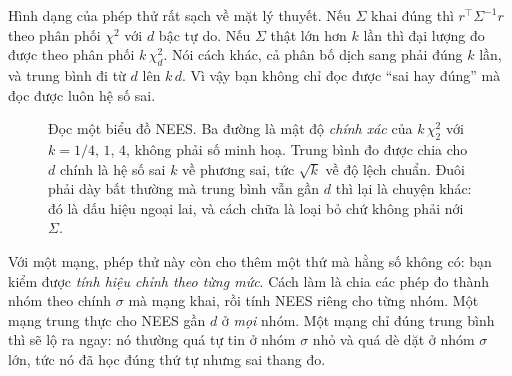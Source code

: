 \documentclass[../../deep_learning.tex]{subfiles}
\begin{document}
Hình dạng của phép thử rất sạch về mặt lý thuyết. Nếu \(\Sigma\) khai đúng thì \(r^{\top}\Sigma^{-1}r\) theo phân phối \(\chi^2\) với \(d\) bậc tự do. Nếu \(\Sigma\) thật lớn hơn \(k\) lần thì đại lượng đo được theo phân phối \(k\,\chi^2_d\). Nói cách khác, cả phân bố dịch sang phải đúng \(k\) lần, và trung bình đi từ \(d\) lên \(k\,d\). Vì vậy bạn không chỉ đọc được ``sai hay đúng'' mà đọc được luôn hệ số sai.

\begin{figure}[H]\centering
{}
\caption{Đọc một biểu đồ NEES. Ba đường là mật độ \emph{chính xác} của \(k\,\chi^2_2\) với \(k = 1/4,\,1,\,4\), không phải số minh hoạ. Trung bình đo được chia cho \(d\) chính là hệ số sai \(k\) về phương sai, tức \(\sqrt{k}\) về độ lệch chuẩn. Đuôi phải dày bất thường mà trung bình vẫn gần \(d\) thì lại là chuyện khác: đó là dấu hiệu ngoại lai, và cách chữa là loại bỏ chứ không phải nới \(\Sigma\).}
\label{fig:f34-nees}
\end{figure}

Với một mạng, phép thử này còn cho thêm một thứ mà hằng số không có: bạn kiểm được \emph{tính hiệu chỉnh theo từng mức}. Cách làm là chia các phép đo thành nhóm theo chính \(\sigma\) mà mạng khai, rồi tính NEES riêng cho từng nhóm. Một mạng trung thực cho NEES gần \(d\) ở \emph{mọi} nhóm. Một mạng chỉ đúng trung bình thì sẽ lộ ra ngay: nó thường quá tự tin ở nhóm \(\sigma\) nhỏ và quá dè dặt ở nhóm \(\sigma\) lớn, tức nó đã học đúng thứ tự nhưng sai thang đo.
\end{document}
